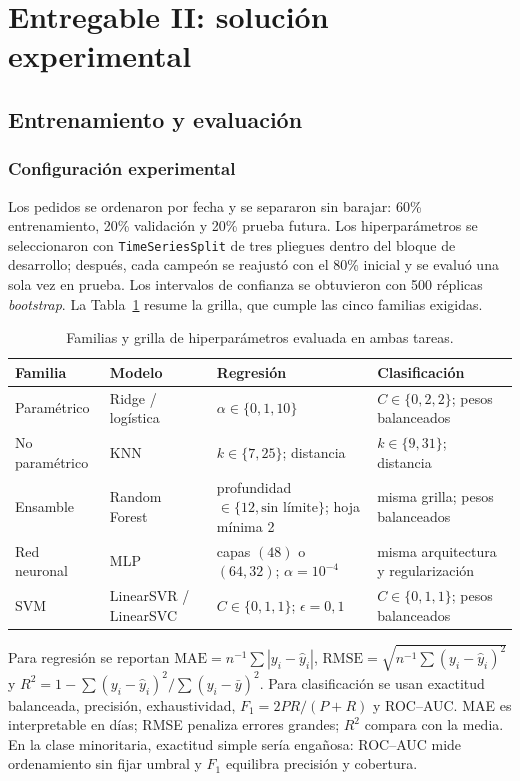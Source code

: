 \documentclass[journal]{IEEEtran}
\begin{document}
\section{Entregable II: solución experimental}
\subsection{Entrenamiento y evaluación}
\subsubsection{Configuración experimental}
Los pedidos se ordenaron por fecha y se separaron sin barajar: 60\% entrenamiento, 20\% validación y 20\% prueba futura. Los hiperparámetros se seleccionaron con \texttt{TimeSeriesSplit} de tres pliegues dentro del bloque de desarrollo; después, cada campeón se reajustó con el 80\% inicial y se evaluó una sola vez en prueba. Los intervalos de confianza se obtuvieron con 500 réplicas \emph{bootstrap}. La Tabla~\ref{tab:grid} resume la grilla, que cumple las cinco familias exigidas.

\begin{table}[t]
\caption{Familias y grilla de hiperparámetros evaluada en ambas tareas.}
\label{tab:grid}
\centering\small
\begin{tabular}{p{2.3cm}p{3.0cm}p{4.7cm}p{4.7cm}}
\toprule
Familia & Modelo & Regresión & Clasificación \\
\midrule
Paramétrico & Ridge / logística & $\alpha\in\{0{,}1,10\}$ & $C\in\{0{,}2,2\}$; pesos balanceados \\
No paramétrico & KNN & $k\in\{7,25\}$; distancia & $k\in\{9,31\}$; distancia \\
Ensamble & Random Forest & profundidad $\in\{12,\text{sin límite}\}$; hoja mínima 2 & misma grilla; pesos balanceados \\
Red neuronal & MLP & capas $(48)$ o $(64,32)$; $\alpha=10^{-4}$ & misma arquitectura y regularización \\
SVM & LinearSVR / LinearSVC & $C\in\{0{,}1,1\}$; $\epsilon=0{,}1$ & $C\in\{0{,}1,1\}$; pesos balanceados \\
\bottomrule
\end{tabular}
\end{table}

Para regresión se reportan $\mathrm{MAE}=n^{-1}\sum|y_i-\hat y_i|$, $\mathrm{RMSE}=\sqrt{n^{-1}\sum(y_i-\hat y_i)^2}$ y $R^2=1-\sum(y_i-\hat y_i)^2/\sum(y_i-\bar y)^2$. Para clasificación se usan exactitud balanceada, precisión, exhaustividad, $F_1=2PR/(P+R)$ y ROC--AUC. MAE es interpretable en días; RMSE penaliza errores grandes; $R^2$ compara con la media. En la clase minoritaria, exactitud simple sería engañosa: ROC--AUC mide ordenamiento sin fijar umbral y $F_1$ equilibra precisión y cobertura.
\end{document}
